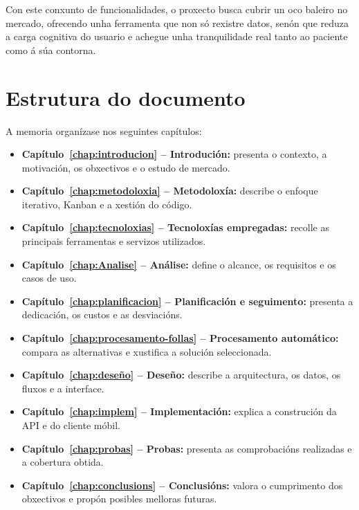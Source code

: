 Con este conxunto de funcionalidades, o proxecto busca cubrir un oco baleiro no mercado, ofrecendo unha ferramenta que non só rexistre datos, senón que reduza a carga cognitiva do usuario e achegue unha tranquilidade real tanto ao paciente como á súa contorna.

\section{Estrutura do documento}

A memoria organízase nos seguintes capítulos:

\begin{itemize}
    \item \textbf{Capítulo~\ref{chap:introducion} -- Introdución:} presenta o contexto, a motivación, os obxectivos e o estudo de mercado.
    \item \textbf{Capítulo~\ref{chap:metodoloxia} -- Metodoloxía:} describe o enfoque iterativo, Kanban e a xestión do código.
    \item \textbf{Capítulo~\ref{chap:tecnoloxias} -- Tecnoloxías empregadas:} recolle as principais ferramentas e servizos utilizados.
    \item \textbf{Capítulo~\ref{chap:Analise} -- Análise:} define o alcance, os requisitos e os casos de uso.
    \item \textbf{Capítulo~\ref{chap:planificacion} -- Planificación e seguimento:} presenta a dedicación, os custos e as desviacións.
    \item \textbf{Capítulo~\ref{chap:procesamento-follas} -- Procesamento automático:} compara as alternativas e xustifica a solución seleccionada.
    \item \textbf{Capítulo~\ref{chap:deseño} -- Deseño:} describe a arquitectura, os datos, os fluxos e a interface.
    \item \textbf{Capítulo~\ref{chap:implem} -- Implementación:} explica a construción da API e do cliente móbil.
    \item \textbf{Capítulo~\ref{chap:probas} -- Probas:} presenta as comprobacións realizadas e a cobertura obtida.
    \item \textbf{Capítulo~\ref{chap:conclusions} -- Conclusións:} valora o cumprimento dos obxectivos e propón posibles melloras futuras.
\end{itemize}